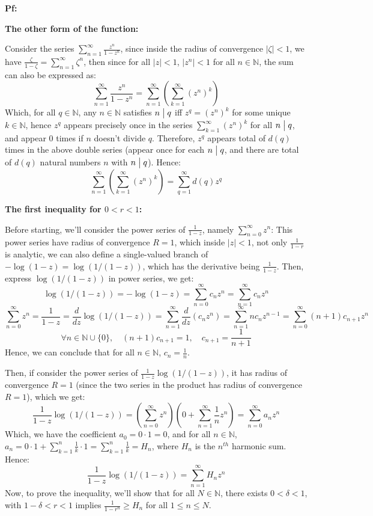 \documentclass{article}
\begin{document}
\textbf{Pf:}

\textbf{The other form of the function:}

Consider the series $\sum_{n=1}^{\infty}\frac{z^n}{1-z^n}$, since inside the radius of convergence $|\zeta|<1$, we have $\frac{\zeta}{1-\zeta}=\sum_{n=1}^{\infty}\zeta^n$,
then since for all $|z|<1$, $|z^n|<1$ for all $n\in\mathbb{N}$, the sum can also be expressed as:
$$\sum_{n=1}^{\infty}\frac{z^n}{1-z^n}=\sum_{n=1}^{\infty}\left(\sum_{k=1}^{\infty}(z^n)^k\right)$$ 
Which, for all $q\in\mathbb{N}$, any $n\in\mathbb{N}$ satisfies $n\bigm| q$ iff $z^q=(z^n)^k$ for some unique $k\in\mathbb{N}$, hence $z^q$ appears precisely once in the series $\sum_{k=1}^{\infty}(z^n)^k$ for all $n\bigm| q$, and appear $0$ times if $n$ doesn't divide $q$.
Therefore, $z^q$ appears total of $d(q)$ times in the above double series (appear once for each $n\bigm| q$, and there are total of $d(q)$ natural numbers $n$ with $n\bigm| q$). Hence:
$$\sum_{n=1}^{\infty}\left(\sum_{k=1}^{\infty}(z^n)^k\right)=\sum_{q=1}^{\infty}d(q)z^q$$

\hfil

\textbf{The first inequality for $0<r<1$:}

Before starting, we'll consider the power series of $\frac{1}{1-z}$, namely $\sum_{n=0}^{\infty}z^n$: This power series have radius of convergence $R=1$, which inside $|z|<1$, not only $\frac{1}{1-r}$ is analytic, we can also define a single-valued branch of $-\log(1-z)=\log(1/(1-z))$, which has the derivative being $\frac{1}{1-z}$.
Then, express $\log(1/(1-z))$ in power series, we get:
$$\log(1/(1-z))=-\log(1-z)=\sum_{n=0}^{\infty}c_nz^n = \sum_{n=1}^{\infty}c_nz^n$$
$$\sum_{n=0}^{\infty}z^n=\frac{1}{1-z}=\frac{d}{dz}\log(1/(1-z))=\sum_{n=1}^{\infty}\frac{d}{dz}(c_nz^n)=\sum_{n=1}^{\infty}nc_nz^{n-1}=\sum_{n=0}^{\infty}(n+1)c_{n+1}z^n$$
$$\forall n\in\mathbb{N}\cup \{0\},\quad (n+1)c_{n+1}=1,\quad c_{n+1}=\frac{1}{n+1}$$
Hence, we can conclude that for all $n\in\mathbb{N}$, $c_n=\frac{1}{n}$.

Then, if consider the power series of $\frac{1}{1-z}\log(1/(1-z))$, it has radius of convergence $R=1$ (since the two series in the product has radius of convergence $R=1$), which we get:
$$\frac{1}{1-z}\log(1/(1-z))=\left(\sum_{n=0}^{\infty}z^n\right)\left(0+\sum_{n=1}^{\infty}\frac{1}{n}z^n\right)=\sum_{n=0}^{\infty}a_nz^n$$
Which, we have the coefficient $a_0= 0 \cdot 1 = 0$, and for all $n\in\mathbb{N}$, $a_n=0\cdot 1 + \sum_{k=1}^{n}\frac{1}{k}\cdot 1 = \sum_{k=1}^{n}\frac{1}{k}=H_n$, where $H_n$ is the $n^{th}$ harmonic sum.
Hence:
$$\frac{1}{1-z}\log(1/(1-z))=\sum_{n=1}^{\infty}H_nz^n$$
Now, to prove the inequality, we'll show that for all $N\in\mathbb{N}$, there exists $0<\delta<1$, with $1-\delta<r<1$ implies $\frac{1}{1-r^n}\geq H_n$ for all $ 1\leq n\leq N$.
\end{document}
